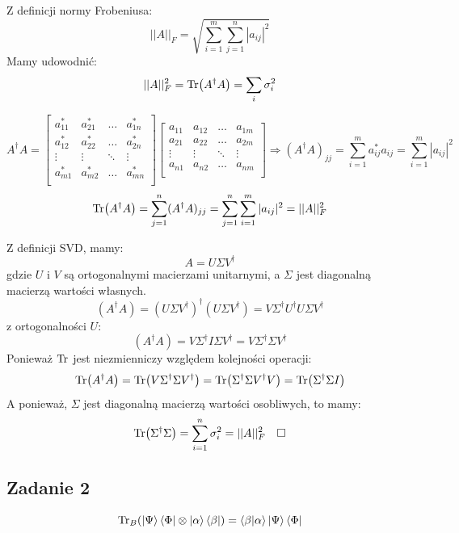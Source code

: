 \documentclass{../notatki}
\begin{document}
Z definicji normy Frobeniusa:
$$
||A||_F = \sqrt{\sum_{i=1}^{m}\sum_{j=1}^{n} |a_{ij}|^2}
$$
Mamy udowodnić:
$$
||A||_F^2 = \Tr(A^\dag A) = \sum_i \sigma_i^2
$$

$$
A^\dag A =
\begin{bmatrix}
  a^*_{11} & a^*_{21} & \dots & a^*_{1n} \\
  a^*_{12} & a^*_{22} & \dots & a^*_{2n} \\
  \vdots & \vdots & \ddots & \vdots \\
  a^*_{m1} & a^*_{m2} & \dots & a^*_{mn} \\
\end{bmatrix}
\begin{bmatrix}
  a_{11} & a_{12} & \dots & a_{1m} \\
  a_{21} & a_{22} & \dots & a_{2m} \\
  \vdots & \vdots & \ddots & \vdots \\
  a_{n1} & a_{n2} & \dots & a_{nm} \\
\end{bmatrix}
\Rightarrow
(A^\dag A)_{jj} = \sum_{i=1}^{m} a^*_{ij} a_{ij} = \sum_{i=1}^{m} |a_{ij}|^2
$$
$$
\Tr(A^\dag A) = \sum_{j=1}^{n} (A^\dag A)_{jj} = \sum_{j=1}^{n}
\sum_{i=1}^{m} |a_{ij}|^2 = ||A||_F^2
$$

Z definicji SVD, mamy:
$$
A = U \Sigma V^\dag
$$
gdzie $U$ i $V$ są ortogonalnymi macierzami unitarnymi, a $\Sigma$
jest diagonalną macierzą wartości własnych.
$$
(A^\dag A) = (U \Sigma V^\dag)^\dag (U \Sigma V^\dag) = V \Sigma^\dag
U^\dag U \Sigma V^\dag
$$
z ortogonalności $U$:
$$
(A^\dag A) = V \Sigma^\dag I \Sigma V^\dag = V \Sigma^\dag \Sigma V^\dag
$$
Ponieważ $\Tr$ jest niezmienniczy względem kolejności operacji:
$$
\Tr(A^\dag A) = \Tr(V \Sigma^\dag \Sigma V^\dag) = \Tr(\Sigma^\dag
\Sigma V^\dag V) = \Tr(\Sigma^\dag \Sigma I)
$$
A ponieważ, $\Sigma$ jest diagonalną macierzą wartości osobliwych, to mamy:
$$
\Tr(\Sigma^\dag \Sigma) = \sum_{i=1}^{n} \sigma_i^2 = ||A||_F^2 \quad \square
$$

\subsection{Zadanie 2}
$$
\Tr_B(\ket{\Psi}\bra{\Phi} \otimes \ket{\alpha}\bra{\beta}) =
\braket{\beta}{\alpha} \ket{\Psi}\bra{\Phi}
$$
\end{document}
